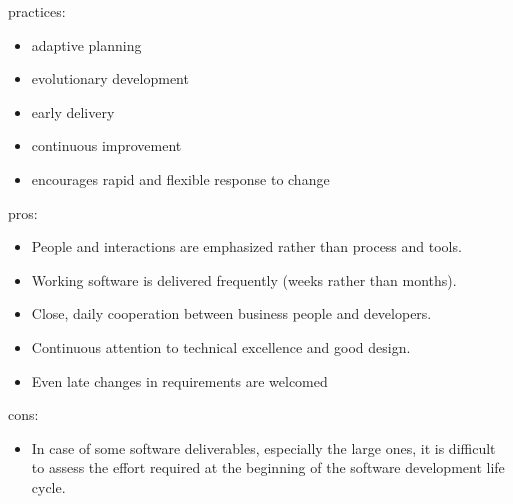 \documentclass[a4paper,11pt]{article}
\begin{document}
\begin{multicols}{2}
\begin{itemize}
\end{itemize}
practices:
\vspace{0 mm}
\begin{itemize}
 \setlength\itemsep{0em}
\item adaptive planning
\item evolutionary development
\item early delivery
\item continuous improvement
\item encourages rapid and flexible response to change
\end{itemize}
pros:
\vspace{0 mm}
\begin{itemize}
 \setlength\itemsep{0em}
\item People and interactions are emphasized rather than process and tools.
\item Working software is delivered frequently (weeks rather than months).
\item Close, daily cooperation between business people and developers.
\item Continuous attention to technical excellence and good design.
\item Even late changes in requirements are welcomed
\end{itemize}
cons:
\vspace{0 mm}
\begin{itemize}
 \setlength\itemsep{0em}
\item In case of some software deliverables, especially the large ones, it is difficult to assess the effort required at the beginning of the software development life cycle.


\end{itemize}
\end{multicols}
\end{document}
